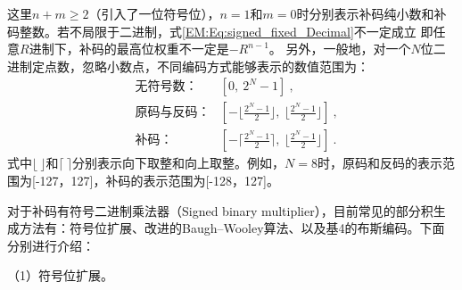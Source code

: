 这里$n+m \ge 2$（引入了一位符号位），$n=1$和$m=0$时分别表示补码纯小数和补码整数。若不局限于二进制，式\eqref{EM:Eq:signed_fixed_Decimal}不一定成立%
即任意$R$进制下，补码的最高位权重不一定是$-R^{n-1}$。
另外，一般地，对一个$N$位二进制定点数，忽略小数点，不同编码方式能够表示的数值范围为：
\begin{align}
    & \text{无符号数：}  & [0, \ 2^N-1] \ , \\
    & \text{原码与反码：}  & [- \lfloor \frac{2^N-1}{2} \rfloor, \ \lfloor \frac{2^N-1}{2} \rfloor] \ , \\
    & \text{补码：} & [- \lceil \frac{2^N-1}{2} \rceil, \ \lfloor \frac{2^N-1}{2} \rfloor] \ .
\end{align}
式中$\lfloor \ \rfloor$和$\lceil \ \rceil$分别表示向下取整和向上取整。例如，$N=8$时，原码和反码的表示范围为[-127，127]，补码的表示范围为[-128，127]。

对于补码有符号二进制乘法器（Signed binary multiplier），目前常见的部分积生成方法有：符号位扩展、改进的Baugh–Wooley算法\cite{EM:baugh-wooley,EM:baugh-wooley_modified_PP_reorga,EM:baugh-wooley_diff}、以及基4的布斯编码\cite{EM:booth_orig,EM:booth_Macsorley,EM:booth_proof}。下面分别进行介绍：

（1）符号位扩展。

